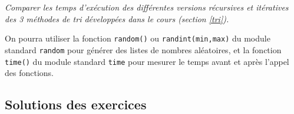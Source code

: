 \begin{td}\label{td:exectri3}
\em
Comparer les temps d'exécution des différentes versions récursives et itératives des
3 méthodes de tri développées dans le cours (section \ref{tri}).

On pourra utiliser la fonction {\tt random()} ou {\tt randint(min,max)} du module standard
{\tt random} pour générer des listes de nombres aléatoires, et la fonction {\tt time()}
du module standard {\tt time} pour mesurer le temps avant et après l'appel des
fonctions.
\end{td}

\subsection{Solutions des exercices}\label{sub:solutionsListes}
